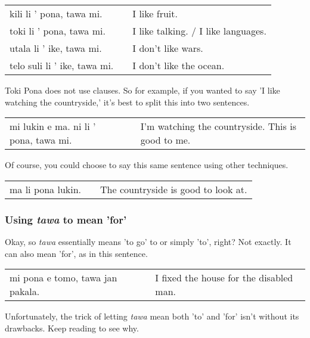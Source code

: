 \begin{supertabular}{p{5,5cm}|ll}
kili li ' pona, tawa mi. && I like fruit. \\
toki li ' pona, tawa mi. && I like talking. / I like languages. \\
utala li ' ike, tawa mi. && I don't like wars. \\
telo suli li ' ike, tawa mi. && I don't like the ocean. \\
\end{supertabular} 

Toki Pona does not use clauses. 
So for example, if you wanted to say 'I like watching the countryside,' it's best to split this into two sentences.

\begin{supertabular}{p{5,5cm}|ll}
mi lukin e ma. ni li ' pona, tawa mi. && I'm watching the countryside. This is good to me.\\
\end{supertabular} 

Of course, you could choose to say this same sentence using other techniques. 

\begin{supertabular}{p{5,5cm}|ll}
ma li pona lukin. && The countryside is good to look at. \\
\end{supertabular} 

\subsubsection*{Using \textit{tawa} to mean 'for'}
%
Okay, so \textit{tawa} essentially means 'to go' to or simply 'to', right? 
Not exactly. 
It can also mean 'for', as in this sentence.
 
\begin{supertabular}{p{5,5cm}|ll}
mi pona e tomo, tawa jan pakala. && I fixed the house for the disabled man. \\
\end{supertabular} 

Unfortunately, the trick of letting \textit{tawa} mean both 'to' and 'for' isn't without its drawbacks. 
Keep reading to see why. 

